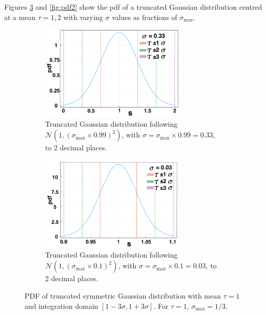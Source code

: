 Figures \ref{fig:pdf1} and \ref{fig:pdf2} show the pdf of a truncated Gaussian distribution centred at a mean $\tau=1,2$ with varying $\sigma$ values as fractions of $\sigma_{\max}$.

\begin{figure}[H]
    \centering
    \begin{subfigure}[t]{0.45\textwidth}
        \centering
        \includegraphics[width=7cm,height=4.5cm]{t1sig1.png}
        \caption{Truncated Gaussian distribution following $\mathcal{N}(1,(\sigma_{\max}\times0.99)^2)$, with $\sigma=\sigma_{\max}\times0.99=0.33$, to 2 decimal places.}
        \label{}
    \end{subfigure}
    \hfill
    \begin{subfigure}[t]{0.45\textwidth}
        \centering
        \includegraphics[width=7cm,height=4.5cm]{t1sig2.png}
        \caption{Truncated Gaussian distribution following $\mathcal{N}(1,(\sigma_{\max}\times0.1)^2)$, with $\sigma=\sigma_{\max}\times0.1=0.03$, to 2 decimal places.}
        \label{}
    \end{subfigure}
\caption{PDF of truncated symmetric Gaussian distribution with mean $\tau=1$ and integration domain $[1-3\sigma,1+3\sigma]$. For $\tau=1$, $\sigma_{\max}=1/3$.}
\label{fig:pdf1}
\end{figure}
